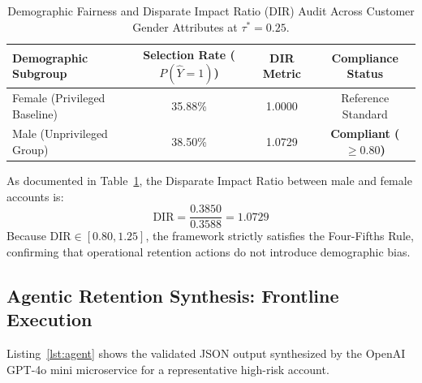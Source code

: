 \documentclass[journal,compsoc]{IEEEtran}
\begin{document}
\begin{table}[!t]
\centering
\caption{Demographic Fairness and Disparate Impact Ratio (DIR) Audit Across Customer Gender Attributes at $\tau^* = 0.25$.}
\label{tab:fairness}
\begin{tabular}{lccc}
\toprule
\textbf{Demographic Subgroup} & \textbf{Selection Rate ($P(\hat{Y}=1)$)} & \textbf{DIR Metric} & \textbf{Compliance Status} \\
\midrule
Female (Privileged Baseline) & 35.88\% & 1.0000 & Reference Standard \\
Male (Unprivileged Group) & 38.50\% & 1.0729 & \textbf{Compliant ($\ge 0.80$)} \\
\bottomrule
\end{tabular}
\end{table}

As documented in Table~\ref{tab:fairness}, the Disparate Impact Ratio between male and female accounts is:
\begin{equation}
\text{DIR} = \frac{0.3850}{0.3588} = 1.0729
\end{equation}
Because $\text{DIR} \in [0.80, 1.25]$, the framework strictly satisfies the Four-Fifths Rule, confirming that operational retention actions do not introduce demographic bias.

\subsection{Agentic Retention Synthesis: Frontline Execution}
Listing~\ref{lst:agent} shows the validated JSON output synthesized by the OpenAI GPT-4o mini microservice for a representative high-risk account.
\end{document}

